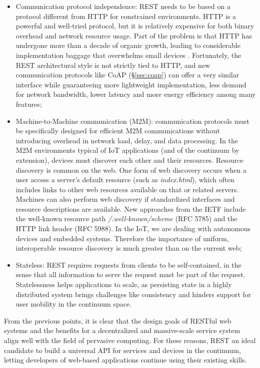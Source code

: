 \begin{itemize}
    \item Communication protocol independence: REST needs to be based on a protocol different from HTTP for constrained environments. HTTP is a powerful and well-tried protocol, but it is relatively expensive for both binary overhead and network resource usage. Part of the problem is that HTTP has undergone more than a decade of organic growth, leading to considerable implementation baggage that overwhelms small devices \cite{coap}. Fortunately, the REST architectural style is not strictly tied to HTTP, and new communication protocols like CoAP (§\ref{sec:coap}) can offer a very similar interface while guaranteeing more lightweight implementation, less demand for network bandwidth, lower latency and more energy efficiency among many features;
    \item Machine-to-Machine communication (M2M): communication protocols must be specifically designed for efficient M2M communications without introducing overhead in network load, delay, and data processing. In the M2M environments typical of IoT applications (and of the continuum by extension), devices must discover each other and their resources. Resource discovery is common on the web. One form of web discovery occurs when a user access a server's default resource (such as \emph{index.html}), which often includes links to other web resources available on that or related servers. Machines can also perform web discovery if standardized interfaces and resource descriptions are available. New approaches from the IETF include the well-known resource path \emph{/.well-known/scheme} (RFC 5785) and the HTTP link header (RFC 5988). In the IoT, we are dealing with autonomous devices and embedded systems. Therefore the importance of uniform, interoperable resource discovery is much greater than on the current web;
    \item Stateless: REST requires requests from clients to be self-contained, in the sense that all information to serve the request must be part of the request. Statelessness helps applications to scale, as persisting state in a highly distributed system brings challenges like consistency and hinders support for user mobility in the continuum space.
\end{itemize}

From the previous points, it is clear that the design goals of RESTful web systems and the benefits for a decentralized and massive-scale service system align well with the field of pervasive computing. For these reasons, REST an ideal candidate to build a universal API for services and devices in the continuum, letting developers of web-based applications continue using their existing skills. 

